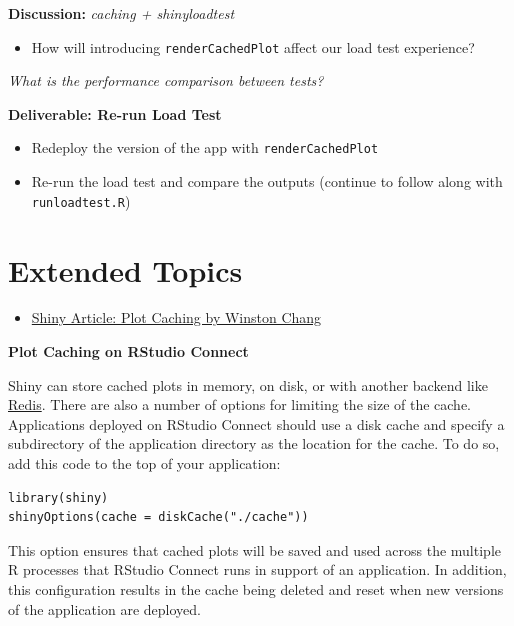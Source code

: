 \documentclass[]{book}
\providecommand{\tightlist}{%
  \setlength{\itemsep}{0pt}\setlength{\parskip}{0pt}}
\theoremstyle{definition}
\theoremstyle{definition}
\theoremstyle{definition}
\theoremstyle{remark}
\begin{document}
\textbf{Discussion:} \emph{caching + shinyloadtest}

\begin{itemize}
\tightlist
\item
  How will introducing \texttt{renderCachedPlot} affect our load test
  experience?
\end{itemize}

\emph{What is the performance comparison between tests?}

\textbf{Deliverable: Re-run Load Test}

\begin{itemize}
\tightlist
\item
  Redeploy the version of the app with \texttt{renderCachedPlot}
\item
  Re-run the load test and compare the outputs (continue to follow along
  with \texttt{runloadtest.R})
\end{itemize}

\hypertarget{extended-topics}{%
\section{Extended Topics}\label{extended-topics}}

\begin{itemize}
\tightlist
\item
  \href{http://shiny.rstudio.com/articles/plot-caching.html}{Shiny
  Article: Plot Caching by Winston Chang}
\end{itemize}

\textbf{Plot Caching on RStudio Connect}

Shiny can store cached plots in memory, on disk, or with another backend
like \href{https://redis.io/}{Redis}. There are also a number of options
for limiting the size of the cache. Applications deployed on RStudio
Connect should use a disk cache and specify a subdirectory of the
application directory as the location for the cache. To do so, add this
code to the top of your application:

\begin{verbatim}
library(shiny)
shinyOptions(cache = diskCache("./cache"))
\end{verbatim}

This option ensures that cached plots will be saved and used across the
multiple R processes that RStudio Connect runs in support of an
application. In addition, this configuration results in the cache being
deleted and reset when new versions of the application are deployed.
\end{document}
